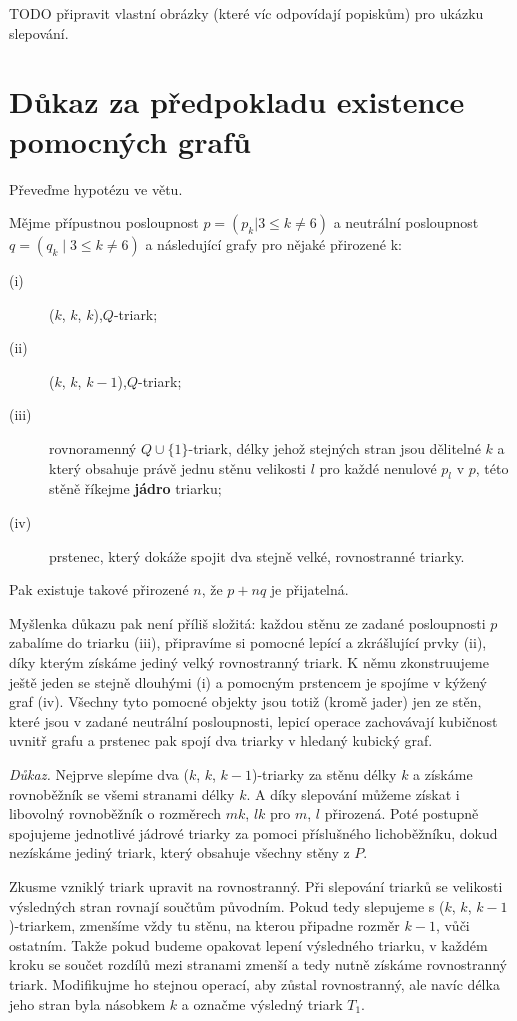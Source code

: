 TODO připravit vlastní obrázky (které víc odpovídají popiskům) pro ukázku slepování.


\section{Důkaz za předpokladu existence pomocných grafů}
Převeďme hypotézu ve větu.

\begin{veta}\label{veta02:2}
Mějme přípustnou posloupnost $p=(p_k | 3 \leq k \neq 6)$ a neutrální posloupnost $q=(q_k \mid 3 \leq k \neq 6)$ a následující grafy pro nějaké přirozené k:
\begin{description}
\item[(i)] ($k$, $k$, $k$),$Q$-triark;
\item[(ii)] ($k$, $k$, $k-1$),$Q$-triark;
\item[(iii)] rovnoramenný $Q\cup \lbrace1\rbrace$-triark, délky jehož stejných stran jsou dělitelné $k$ a který obsahuje právě jednu stěnu velikosti $l$ pro každé nenulové $p_l$ v $p$, této stěně říkejme \textbf{jádro} triarku;
\item[(iv)] prstenec, který dokáže spojit dva stejně velké, rovnostranné triarky.
\end{description}

Pak existuje takové přirozené $n$, že $p+nq$ je přijatelná.
\end{veta}


Myšlenka důkazu pak není příliš složitá: každou stěnu ze zadané posloupnosti $p$ zabalíme do triarku (iii), připravíme si pomocné lepící a zkrášlující prvky (ii), díky kterým získáme jediný velký rovnostranný triark. K němu zkonstruujeme ještě jeden se stejně dlouhými (i) a pomocným prstencem je spojíme v kýžený graf (iv). Všechny tyto pomocné objekty jsou totiž (kromě jader) jen ze stěn, které jsou v zadané neutrální posloupnosti, lepicí operace zachovávají kubičnost uvnitř grafu a prstenec pak spojí dva triarky v hledaný kubický graf.

\textit{Důkaz.} Nejprve slepíme dva ($k$, $k$, $k-1$)-triarky za stěnu délky $k$ a získáme rovnoběžník se všemi stranami délky $k$. A díky slepování můžeme získat i libovolný rovnoběžník o rozměrech $mk$, $lk$ pro $m$, $l$ přirozená. Poté postupně spojujeme jednotlivé jádrové triarky za pomoci příslušného lichoběžníku, dokud nezískáme jediný triark, který obsahuje všechny stěny z $P$.

Zkusme vzniklý triark upravit na rovnostranný. Při slepování triarků se velikosti výsledných stran rovnají součtům původním. Pokud tedy slepujeme s ($k$, $k$, $k-1$)-triarkem, zmenšíme vždy tu stěnu, na kterou připadne rozměr $k-1$, vůči ostatním. Takže pokud budeme opakovat lepení výsledného triarku, v každém kroku se součet rozdílů mezi stranami zmenší a tedy nutně získáme rovnostranný triark. Modifikujme ho stejnou operací, aby zůstal rovnostranný, ale navíc délka jeho stran byla násobkem $k$ a označme výsledný triark $T_1$.

